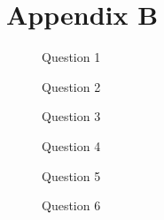 \documentclass[fleqn,moreauthors,10pt]{ds_report}
\begin{document}
\clearpage

\section*{Appendix B}

\begin{figure}[H]
    \centering
    
    \caption{Question 1}
    \label{fig:question_1}
\end{figure}

\begin{figure}[H]
    \centering
    
    \caption{Question 2}
    \label{fig:question_2}
\end{figure}

\begin{figure}[H]
    \centering
    
    \caption{Question 3}
    \label{fig:question_3}
\end{figure}

\begin{figure}[H]
    \centering
    
    \caption{Question 4}
    \label{fig:question_4}
\end{figure}

\begin{figure}[H]
    \centering
    
    \caption{Question 5}
    \label{fig:question_5}
\end{figure}

\begin{figure}[H]
    \centering
    
    \caption{Question 6}
    \label{fig:question_6}
\end{figure}
\end{document}
